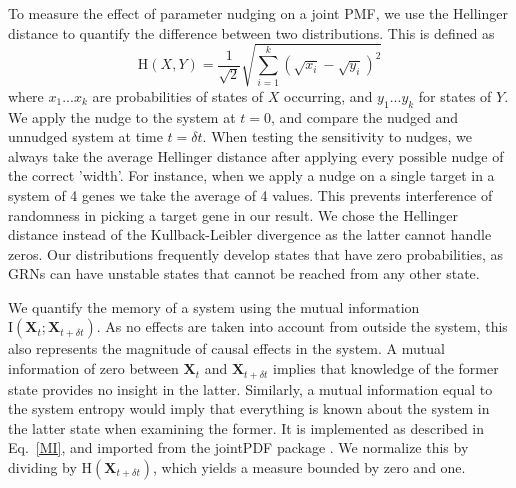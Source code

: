 \documentclass[../main.tex]{subfiles}
\begin{document}
To measure the effect of parameter nudging on a joint PMF, we use the Hellinger distance to quantify the difference between two distributions.
This is defined as
%
\begin{equation}
\mathrm{H}\left( X, Y\right) = \frac{1}{\sqrt{2}} \sqrt{\sum^k_{i=1} (\sqrt{x_i} - \sqrt{y_i})^2}
\end{equation}
%
where ${x_1 ... x_k}$ are probabilities of states of $X$ occurring, and ${y_1 ... y_k}$ for states of $Y$.
We apply the nudge to the system at $t = 0$, and compare the nudged and unnudged system at time $t = \delta t$.
When testing the sensitivity to nudges, we always take the average Hellinger distance after applying every possible nudge of the correct 'width'.
For instance, when we apply a nudge on a single target in a system of 4 genes we take the average of 4 values.
This prevents interference of randomness in picking a target gene in our result.
We chose the Hellinger distance instead of the Kullback-Leibler divergence as the latter cannot handle zeros.
Our distributions frequently develop states that have zero probabilities, as GRNs can have unstable states that cannot be reached from any other state.

We quantify the memory of a system using the mutual information $\mathrm{I}\left(\mathbf{X}_t ; \mathbf{X}_{t + \delta t}\right)$.
As no effects are taken into account from outside the system, this also represents the magnitude of causal effects in the system.
A mutual information of zero between $\mathbf{X}_t$ and $\mathbf{X}_{t + \delta t}$ implies that knowledge of the former state provides no insight in the latter.
Similarly, a mutual information equal to the system entropy would imply that everything is known about the system in the latter state when examining the former.
It is implemented as described in Eq.~\ref{MI}, and imported from the jointPDF package \cite{jointpdf}.
We normalize this by dividing by $\mathrm{H}\left(\mathbf{X}_{t + \delta t}\right)$, which yields a measure bounded by zero and one.
\end{document}
